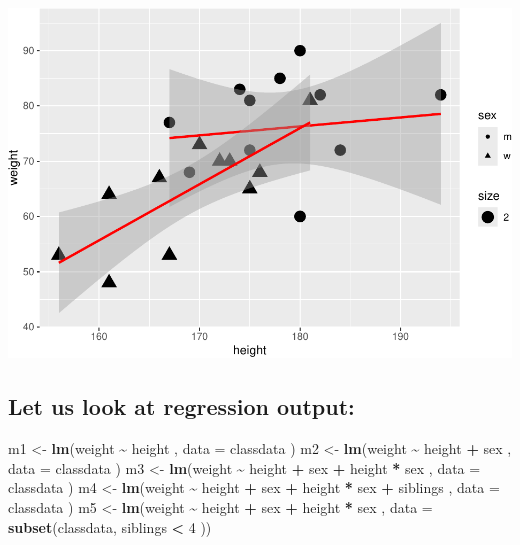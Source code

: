 \documentclass[
  doc]{apa6}
\newenvironment{Shaded}{\begin{snugshade}}{\end{snugshade}}
\newcommand{\AttributeTok}[1]{\textcolor[rgb]{0.13,0.29,0.53}{#1}}
\newcommand{\DecValTok}[1]{\textcolor[rgb]{0.00,0.00,0.81}{#1}}
\newcommand{\FunctionTok}[1]{\textcolor[rgb]{0.13,0.29,0.53}{\textbf{#1}}}
\newcommand{\NormalTok}[1]{#1}
\newcommand{\OtherTok}[1]{\textcolor[rgb]{0.56,0.35,0.01}{#1}}
\newcommand{\SpecialCharTok}[1]{\textcolor[rgb]{0.81,0.36,0.00}{\textbf{#1}}}
\begin{document}
\includegraphics{rmd_reg_files/figure-latex/unnamed-chunk-15-1.pdf}

\newpage

\subsection{Let us look at regression output:}\label{let-us-look-at-regression-output}

\begin{Shaded}
\begin{Highlighting}[]
\NormalTok{m1 }\OtherTok{\textless{}{-}} \FunctionTok{lm}\NormalTok{(weight }\SpecialCharTok{\textasciitilde{}}\NormalTok{ height , }\AttributeTok{data =}\NormalTok{ classdata )}
\NormalTok{m2 }\OtherTok{\textless{}{-}} \FunctionTok{lm}\NormalTok{(weight }\SpecialCharTok{\textasciitilde{}}\NormalTok{ height }\SpecialCharTok{+}\NormalTok{ sex , }\AttributeTok{data =}\NormalTok{ classdata )}
\NormalTok{m3 }\OtherTok{\textless{}{-}} \FunctionTok{lm}\NormalTok{(weight }\SpecialCharTok{\textasciitilde{}}\NormalTok{ height }\SpecialCharTok{+}\NormalTok{ sex }\SpecialCharTok{+}\NormalTok{ height }\SpecialCharTok{*}\NormalTok{ sex , }\AttributeTok{data =}\NormalTok{ classdata )}
\NormalTok{m4 }\OtherTok{\textless{}{-}} \FunctionTok{lm}\NormalTok{(weight }\SpecialCharTok{\textasciitilde{}}\NormalTok{ height }\SpecialCharTok{+}\NormalTok{ sex }\SpecialCharTok{+}\NormalTok{ height }\SpecialCharTok{*}\NormalTok{ sex }\SpecialCharTok{+}\NormalTok{ siblings , }\AttributeTok{data =}\NormalTok{ classdata )}
\NormalTok{m5 }\OtherTok{\textless{}{-}} \FunctionTok{lm}\NormalTok{(weight }\SpecialCharTok{\textasciitilde{}}\NormalTok{ height }\SpecialCharTok{+}\NormalTok{ sex }\SpecialCharTok{+}\NormalTok{ height }\SpecialCharTok{*}\NormalTok{ sex , }\AttributeTok{data =} \FunctionTok{subset}\NormalTok{(classdata, siblings }\SpecialCharTok{\textless{}} \DecValTok{4}\NormalTok{ ))}
\end{Highlighting}
\end{Shaded}
\end{document}
